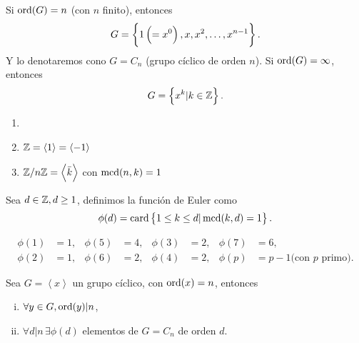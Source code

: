 \begin{obs}
    Si $\operatorname{ord}(G) = n$ (con $n$ finito), entonces
    \[
        G = \left\{ 1 \left( = x^0 \right), x, x^2, \dots, x^{n-1}\right\}.
    \]
    Y lo denotaremos cono $G = C_n$ (grupo cíclico de orden $n$).
    Si $\operatorname{ord}(G) = \infty$, entonces
    \[
        G = \left\{x^k \vert k \in \mathbb{Z}\right\}.
    \]
\end{obs}

\begin{example}
    \begin{enumerate}[1.]
        \item[]
        \item $\mathbb{Z} = \left< 1 \right> = \left< -1 \right>$
        \item $\mathbb{Z}/n\mathbb{Z} = \left< \bar{k} \right>$ con $\operatorname{mcd}(n, k) = 1$
    \end{enumerate}
\end{example}

\begin{defi}
    Sea $d \in \mathbb{Z}, d \geq 1$, definimos la función de Euler como
    \[
        \phi(d) = \operatorname{card} \left\{ 1 \leq k \leq d \vert \operatorname{mcd}(k, d) = 1\right\}.
    \]
\end{defi}

\begin{example}
    \begin{align*}
        \phi(1) &= 1, & \phi(5) &= 4, & \phi(3) &= 2, & \phi(7) &= 6, \\
        \phi(2) &= 1, & \phi(6) &= 2, & \phi(4) &= 2, & \phi(p) &= p-1 \text{(con } p \text{ primo).} 
    \end{align*}
\end{example}

\begin{prop}
    Sea $G = \left< x \right>$ un grupo cíclico, con $\operatorname{ord}(x) = n$, entonces
    \begin{enumerate}[i)]
        \item $\forall y \in G, \operatorname{ord}(y) \vert n$,
        \item $\forall d \vert n \, \exists \phi(d)$ elementos de $G = C_n$ de orden $d$.
    \end{enumerate}
\end{prop}

